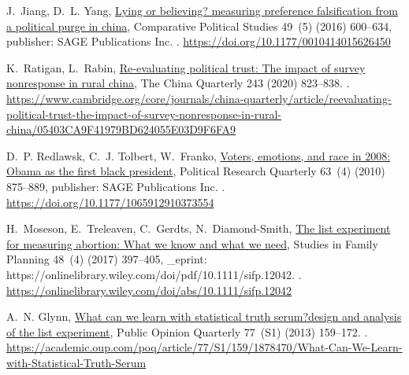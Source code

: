 \documentclass[
  number]{elsarticle}
\begin{document}
\begin{thebibliography}{10}
J.~Jiang, D.~L. Yang, \href{https://doi.org/10.1177/0010414015626450}{Lying or believing? measuring preference falsification from a political purge in china}, Comparative Political Studies 49~(5) (2016) 600--634, publisher: SAGE Publications Inc.
\newblock \href {https://doi.org/10.1177/0010414015626450} {}.
\newline\urlprefix\url{https://doi.org/10.1177/0010414015626450}

K.~Ratigan, L.~Rabin, \href{https://www.cambridge.org/core/journals/china-quarterly/article/reevaluating-political-trust-the-impact-of-survey-nonresponse-in-rural-china/05403CA9F41979BD624055E03D9F6FA9}{Re-evaluating political trust: The impact of survey nonresponse in rural china}, The China Quarterly 243 (2020) 823--838.
\newblock \href {https://doi.org/10.1017/S0305741019001231} {}.
\newline\urlprefix\url{https://www.cambridge.org/core/journals/china-quarterly/article/reevaluating-political-trust-the-impact-of-survey-nonresponse-in-rural-china/05403CA9F41979BD624055E03D9F6FA9}

D.~P. Redlawsk, C.~J. Tolbert, W.~Franko, \href{https://doi.org/10.1177/1065912910373554}{Voters, emotions, and race in 2008: Obama as the first black president}, Political Research Quarterly 63~(4) (2010) 875--889, publisher: SAGE Publications Inc.
\newblock \href {https://doi.org/10.1177/1065912910373554} {}.
\newline\urlprefix\url{https://doi.org/10.1177/1065912910373554}

H.~Moseson, E.~Treleaven, C.~Gerdts, N.~Diamond-Smith, \href{https://onlinelibrary.wiley.com/doi/abs/10.1111/sifp.12042}{The list experiment for measuring abortion: What we know and what we need}, Studies in Family Planning 48~(4) (2017) 397--405, {\_}eprint: https://onlinelibrary.wiley.com/doi/pdf/10.1111/sifp.12042.
\newblock \href {https://doi.org/10.1111/sifp.12042} {}.
\newline\urlprefix\url{https://onlinelibrary.wiley.com/doi/abs/10.1111/sifp.12042}

A.~N. Glynn, \href{https://academic.oup.com/poq/article/77/S1/159/1878470/What-Can-We-Learn-with-Statistical-Truth-Serum}{What can we learn with statistical truth serum?design and analysis of the list experiment}, Public Opinion Quarterly 77~(S1) (2013) 159--172.
\newblock \href {https://doi.org/10.1093/poq/nfs070} {}.
\newline\urlprefix\url{https://academic.oup.com/poq/article/77/S1/159/1878470/What-Can-We-Learn-with-Statistical-Truth-Serum}


\end{thebibliography}
\end{document}
